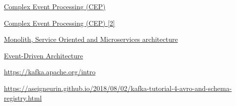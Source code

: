 \documentclass[10pt,a4paper]{article}
\begin{document}
\begin{thebibliography}{1}
\newblock \href{https://databricks.com/glossary/complex-event-processing}{Complex Event Processing (CEP)}

\newblock \href{https://datainsights.de/complex-event-processing}{Complex Event Processing (CEP) [2]}

\newblock \href{https://rubygarage.org/blog/monolith-soa-microservices-serverless}{Monolith, Service Oriented and Microservices architecture}

\newblock \href{https://aws.amazon.com/it/event-driven-architecture/}{Event-Driven Architecture}

\newblock \href{Kafka Basics}{https://kafka.apache.org/intro}

\newblock \href{Avro and Schema Registry}{https://aseigneurin.github.io/2018/08/02/kafka-tutorial-4-avro-and-schema-registry.html}

\end{thebibliography}
\end{document}
